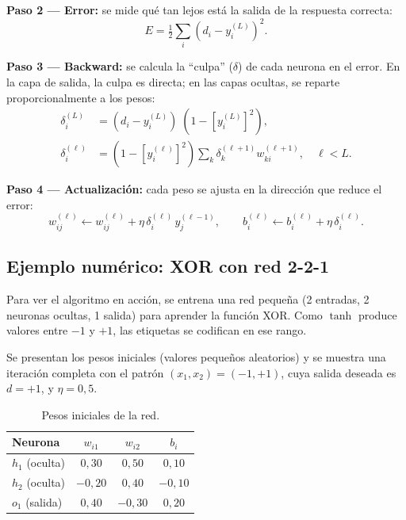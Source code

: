 \textbf{Paso 2 --- Error:} se mide qué tan lejos está la salida de la respuesta correcta:
\[
    E = \tfrac{1}{2}\sum_{i}(d_i - y_i^{(L)})^2.
\]

\textbf{Paso 3 --- Backward:} se calcula la ``culpa'' ($\delta$) de cada neurona en el error. En la capa de salida, la culpa es directa; en las capas ocultas, se reparte proporcionalmente a los pesos:
\begin{align}
    \delta_{i}^{(L)} &= (d_i - y_i^{(L)})\;(1 - [y_i^{(L)}]^2), \label{eq:delta-out}\\
    \delta_{i}^{(\ell)} &= (1 - [y_i^{(\ell)}]^2) \sum_{k} \delta_k^{(\ell+1)} w_{ki}^{(\ell+1)}, \quad \ell < L. \label{eq:delta-hid}
\end{align}

\textbf{Paso 4 --- Actualización:} cada peso se ajusta en la dirección que reduce el error:
\begin{equation}
    w_{ij}^{(\ell)} \leftarrow w_{ij}^{(\ell)} + \eta\,\delta_i^{(\ell)}\,y_j^{(\ell-1)}, \qquad b_i^{(\ell)} \leftarrow b_i^{(\ell)} + \eta\,\delta_i^{(\ell)}.
\end{equation}

\subsection{Ejemplo numérico: XOR con red 2-2-1}

Para ver el algoritmo en acción, se entrena una red pequeña (2 entradas, 2 neuronas ocultas, 1 salida) para aprender la función XOR. Como $\tanh$ produce valores entre $-1$ y $+1$, las etiquetas se codifican en ese rango.

Se presentan los pesos iniciales (valores pequeños aleatorios) y se muestra una iteración completa con el patrón $(x_1, x_2) = (-1, +1)$, cuya salida deseada es $d = +1$, y $\eta = 0{,}5$.

\begin{table}[H]
    \centering\small
    \caption{Pesos iniciales de la red.}
    \label{tab:pesos-iniciales}
    \begin{tabular}{lccc}
        \toprule
        \textbf{Neurona} & $w_{i1}$ & $w_{i2}$ & $b_i$ \\
        \midrule
        $h_1$ (oculta) & $0{,}30$ & $0{,}50$ & $0{,}10$ \\
        $h_2$ (oculta) & $-0{,}20$ & $0{,}40$ & $-0{,}10$ \\
        $o_1$ (salida) & $0{,}40$ & $-0{,}30$ & $0{,}20$ \\
        \bottomrule
    \end{tabular}
\end{table}

